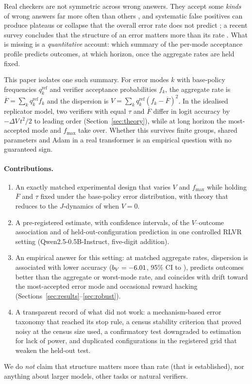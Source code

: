 \documentclass[11pt]{article}
\newcommand{\Fbar}{\overline{F}}
\newcommand{\fmax}{f_{\max}}
\newcommand{\qref}{q^{\mathrm{ref}}}
\begin{document}
Real checkers are not symmetric across wrong answers. They accept some \emph{kinds} of wrong answers far more often than others \citep{huang2025from,xin2026where,ray2026before}, and systematic false positives can produce plateaus or collapse that the overall error rate does not predict \citep{egashira2026delay}; a recent survey concludes that the structure of an error matters more than its rate \citep{gupta2026checking}.
What is missing is a \emph{quantitative} account: which summary of the per-mode acceptance profile predicts outcomes, at which horizon, once the aggregate rates are held fixed.

This paper isolates one such summary. For error modes $k$ with base-policy frequencies $\qref_k$ and verifier acceptance probabilities $f_k$, the aggregate rate is $\Fbar=\sum_k \qref_k f_k$ and the dispersion is $V=\sum_k \qref_k (f_k-\Fbar)^2$.
In the idealised replicator model, two verifiers with equal $\tau$ and $\Fbar$ differ in logit accuracy by $-\Delta V\,t^2/2$ to leading order (Section~\ref{sec:theory}), while at long horizon the most-accepted mode and $\fmax$ take over.
Whether this survives finite groups, shared parameters and Adam in a real transformer is an empirical question with no guaranteed sign.

\paragraph{Contributions.}
\begin{enumerate}
\item An exactly matched experimental design that varies $V$ and $\fmax$ while holding $\Fbar$ and $\tau$ fixed under the base-policy error distribution, with theory that reduces to the $J$-dynamics of \citet{rad2026rate} when $V=0$.
\item A pre-registered estimate, with confidence intervals, of the $V$--outcome association and of held-out-configuration prediction in one controlled RLVR setting (Qwen2.5-0.5B-Instruct, five-digit addition).
\item An empirical answer for this setting: at matched aggregate rates, dispersion is associated with lower accuracy ($b_V=-6.01$, 95\% CI \HoneLo{} to \HoneHi), predicts outcomes better than the aggregate or worst-mode rate, and coincides with drift toward the most-accepted error mode and occasional reward hacking (Sections~\ref{sec:results}--\ref{sec:robust}).
\item A transparent record of what did not work: a mechanism-based error taxonomy that reached its stop rule, a census stability criterion that proved noisy at the census size used, a confirmatory test downgraded to estimation for lack of power, and duplicated configurations in the registered grid that weaken the held-out test.
\end{enumerate}
We do \emph{not} claim that structure matters more than rate (that is established), nor anything about larger models, other tasks or natural verifiers.
\end{document}
